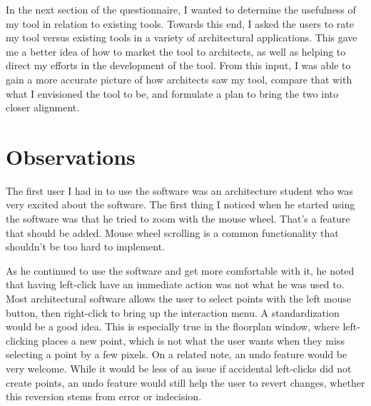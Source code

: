 \documentclass{thesis}
\begin{document}
In the next section of the questionnaire, I wanted to determine the usefulness of my tool in relation to existing tools.  Towards
this end, I asked the users to rate my tool versus existing tools in a variety of architectural applications.  This gave me a
better idea of how to market the tool to architects, as well as helping to direct my efforts in the development of the tool.
From this input, I was able to gain a more accurate picture of how architects saw my tool, compare that with what I
envisioned the tool to be, and formulate a plan to bring the two into closer alignment.

\section{Observations}
The first user I had in to use the software was an architecture student who was very excited about the software.
The first thing I noticed when he started using the software was that he tried to zoom with the mouse wheel.  That's a feature that
should be added.  Mouse wheel scrolling is a common functionality that shouldn't be too hard to implement.

As he continued to use the software and get more comfortable with it, he noted that having left-click have an immediate action was not
what he was used to. Most architectural software allows the user to select points with the left mouse button, then right-click to
bring up the interaction menu.  A standardization would be a good idea.  This is especially true in the floorplan window, where
left-clicking places a new point, which is not what the user wants when they miss selecting a point by a few pixels.  On a related
note, an undo feature would be very welcome.  While it would be less of an issue if accidental left-clicks did not create points,
an undo feature would still help the user to revert changes, whether this reversion stems from error or indecision.
\end{document}
